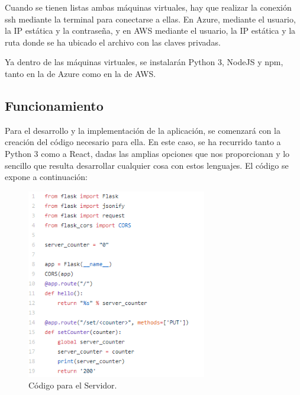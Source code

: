 \documentclass[english,runningheads,a4paper]{llncs}[2018/03/10]
\begin{document}
Cuando se tienen listas ambas máquinas virtuales, hay que realizar la conexión ssh
mediante la terminal para conectarse a ellas. En Azure, mediante el usuario, la IP
estática y la contraseña, y en AWS mediante el usuario, la IP estática y la ruta
donde se ha ubicado el archivo con las claves privadas.

Ya dentro de las máquinas virtuales, se instalarán Python 3, NodeJS y npm, tanto en
la de Azure como en la de AWS.

\subsection{Funcionamiento}

Para el desarrollo y la implementación de la aplicación, se comenzará con la
creación del código necesario para ella. En este caso, se ha recurrido tanto a
Python 3 como a React, dadas las amplias opciones que nos proporcionan y lo
sencillo que resulta desarrollar cualquier cosa con estos lenguajes. El código se
expone a continuación:

\begin{figure}[H]
 \centering
 \includegraphics[width=0.7\textwidth]{./Web/Azure/CodigoServer.png}
 \caption{Código para el Servidor.}
\end{figure}
\end{document}
